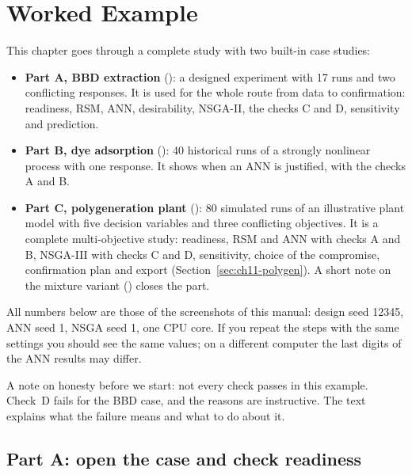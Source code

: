 \chapter{Worked Example}\label{chap:11}
\label{ch:11}

This chapter goes through a complete study with two built-in case studies:
\begin{itemize}
  \item \textbf{Part A, BBD extraction} (): a designed experiment with 17
        runs and two conflicting responses. It is used for the whole route from data to confirmation: readiness, RSM,
        ANN, desirability, NSGA-II, the checks C and D, sensitivity and prediction.
  \item \textbf{Part B, dye adsorption} (): 40 historical runs of a strongly nonlinear
        process with one response. It shows when an ANN is justified, with the checks A and B.
  \item \textbf{Part C, polygeneration plant} (): 80 simulated runs of an
        illustrative plant model with five decision variables and three conflicting objectives. It is a complete
        multi-objective study: readiness, RSM and ANN with checks A and B, NSGA-III with checks C and D, sensitivity,
        choice of the compromise, confirmation plan and export (Section~\ref{sec:ch11-polygen}). A short note on the
        mixture variant () closes the part.
\end{itemize}
All numbers below are those of the screenshots of this manual: design seed 12345, ANN seed 1, NSGA seed 1, one CPU
core. If you repeat the steps with the same settings you should see the same values; on a different computer the last
digits of the ANN results may differ.

A note on honesty before we start: not every check passes in this example. Check~D fails for the BBD case, and the
reasons are instructive. The text explains what the failure means and what to do about it.

\section{Part A: open the case and check readiness}
\label{sec:ch11-open}

